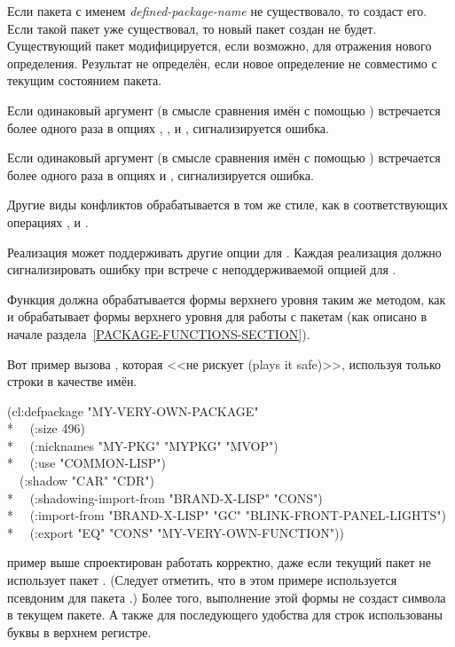 \begin{defun}[Переменная]
\begin{defmac}
Если пакета с именем \emph{defined-package-name} не существовало, то
 создаст его. Если такой пакет уже существовал, то новый пакет
создан не будет. Существующий пакет модифицируется, если возможно, для отражения
нового определения. Результат не определён, если новое определение не совместимо
с текущим состоянием пакета.

Если одинаковый аргумент  (в смысле сравнения имён с помощью
) встречается более одного раза в опциях ,
,  и , сигнализируется
ошибка.

Если одинаковый аргумент  (в смысле сравнения имён с помощью
) встречается более одного раза в опциях  и
, сигнализируется ошибка.

Другие виды конфликтов обрабатывается в том же стиле, как в соответствующих
операциях ,  и .

Реализация может поддерживать другие опции для .
Каждая реализация должно сигнализировать ошибку при встрече с неподдерживаемой
опцией для .

Функция  должна обрабатывается формы верхнего уровня
 таким же методом, как и обрабатывает формы верхнего уровня для
работы с пакетам (как описано в начале раздела~\ref{PACKAGE-FUNCTIONS-SECTION}).

Вот пример вызова , которая <<не рискует (plays it safe)>>, используя только
строки в качестве имён.
\begin{lisp}
(cl:defpackage "MY-VERY-OWN-PACKAGE" \\*
~~(:size 496) \\*
~~(:nicknames "MY-PKG" "MYPKG" "MVOP") \\*
~~(:use "COMMON-LISP") \\
~~(:shadow "CAR" "CDR") \\*
~~(:shadowing-import-from "BRAND-X-LISP" "CONS") \\*
~~(:import-from "BRAND-X-LISP" "GC" "BLINK-FRONT-PANEL-LIGHTS") \\*
~~(:export "EQ" "CONS" "MY-VERY-OWN-FUNCTION"))
\end{lisp}
 пример выше спроектирован работать корректно, даже если текущий
пакет не использует пакет . (Следует отметить, что
в этом примере используется псевдоним  для пакета .)
Более того, выполнение этой формы  не создаст символа в текущем
пакете. А также для последующего удобства для строк использованы буквы в верхнем
регистре.


\end{defmac}
\end{defun}
